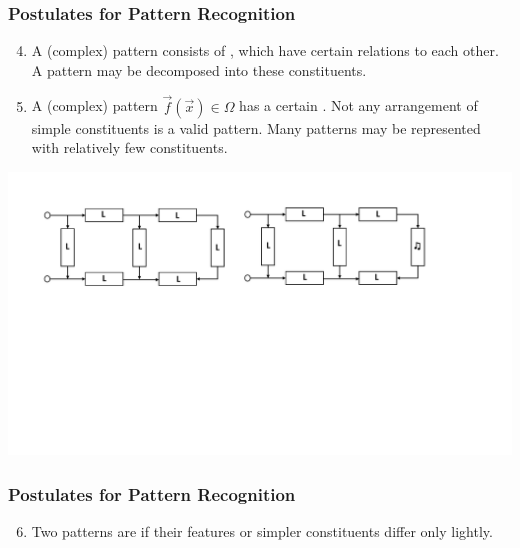 \begin{frame}
   \frametitle{Postulates for Pattern Recognition \cont}

   \begin{enumerate}
      \setcounter{enumi}{3}
      \item A (complex) pattern consists of , which have certain relations to each other. A pattern may be decomposed into these constituents.\\[.3cm]
        \pause
      \item A (complex) pattern $\vec{f}(\vec{x}) \in \Omega$ has a certain .
        Not any arrangement of simple constituents is a valid pattern. Many patterns may be represented with relatively few constituents.
   \end{enumerate}

   \begin{center}
      \includegraphics[width=\linewidth, trim={2cm 10cm 5cm 0cm},clip]{images/circuit.pdf}
   \end{center}
\end{frame}


\begin{frame}
   \frametitle{Postulates for Pattern Recognition \cont}

   \begin{enumerate}
      \setcounter{enumi}{5}
      \item Two patterns are  if their features or simpler constituents differ only lightly.
   \end{enumerate}
\end{frame}


